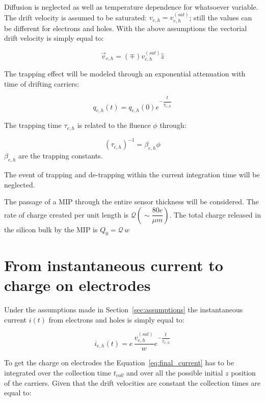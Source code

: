 Diffusion is neglected as well as temperature dependence for whatsoever variable. 
The drift velocity is assumed to be saturated: $v_{e,h}=v^{(sat)}_{e,h}$; still the values can be different for electrons and holes. 
With the above assumptions the vectorial drift velocity is simply equal to:

\begin{equation}
\vec{v}_{e,h}=(\mp)v^{(sat)}_{e,h}\hat{z}
\end{equation}

The trapping effect will be modeled through an exponential attenuation with time of drifting carriers:

\begin{equation}
q_{e,h}(t) = q_{e,h}(0)e^{-\dfrac{t}{\tau_{e,h}}}
\end{equation}

The trapping time $\tau_{e,h}$ is related to the fluence $\phi$ through:

\begin{equation}
(\tau_{e,h})^{-1}=\beta_{e,h}\phi
\end{equation}
$\beta_{e,h}$ are the trapping constants.

The event of trapping and de-trapping within the current integration time will be neglected.

The passage of a MIP through the entire sensor thickness will be considered. The 
rate of charge created per unit length is $\mathcal{Q} (\sim \dfrac{80e}{\mu m})$. The total charge 
released in the silicon bulk by the MIP is $Q_0=\mathcal{Q}\,w$

\section{From instantaneous current to charge on electrodes}
\label{sec:charge}
Under the assumptions made in Section~\ref{sec:assumptions} the instantaneous current $i(t)$ 
from electrons and holes is simply equal to:

\begin{equation}
i_{e,h}(t)=e\,\dfrac{v^{(sat)}_{e,h}}{w}e^{-\dfrac{t}{\tau_{e,h}}}
\label{eq:final_current}
\end{equation}

To get the charge on electrodes the Equation~\ref{eq:final_current} has to be integrated over the collection time $t_{coll}$ and over all the possible initial $z$ position of the carriers.
Given that the drift velocities are constant the collection times are equal to:

